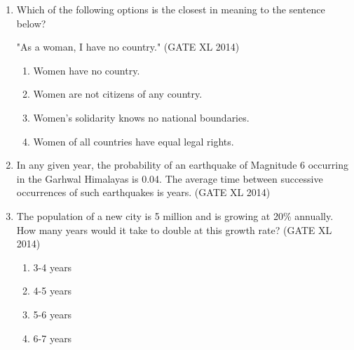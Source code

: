 \documentclass[journal,12pt,onecolumn]{IEEEtran}
\theoremstyle{remark}
\begin{document}
\begin{enumerate}
    \item Which of the following options is the closest in meaning to the sentence below?
    \par
    "As a woman, I have no country."
 \hfill (GATE XL 2014)\\   
        \begin{enumerate} 
            \item Women have no country.
            \item Women are not citizens of any country.
            \item Women's solidarity knows no national boundaries.
            \item Women of all countries have equal legal rights.
        \end{enumerate}
\vspace{0.2cm}
    \item In any given year, the probability of an earthquake of Magnitude 6 occurring in the Garhwal Himalayas is 0.04. The average time between successive occurrences of such earthquakes is \underline{\hspace{2cm}} years.
    \hfill (GATE XL 2014)\\
\vspace{0.2cm}
    \item The population of a new city is 5 million and is growing at 20\% annually. How many years would it take to double at this growth rate?
\hfill (GATE XL 2014)\\
\begin{multicols}{2}
        \begin{enumerate}
            \item 3-4 years
            \item 4-5 years
            \item 5-6 years
            \item 6-7 years
        \end{enumerate}
    \end{multicols}
\end{enumerate}
\end{document}
